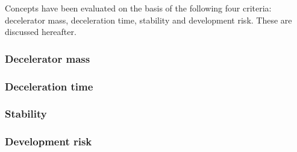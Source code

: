 Concepts have been evaluated on the basis of the following four criteria: decelerator mass, deceleration time, stability and development risk. These are discussed hereafter.

\subsubsection{Decelerator mass}

\subsubsection{Deceleration time}

\subsubsection{Stability}

\subsubsection{Development risk}



